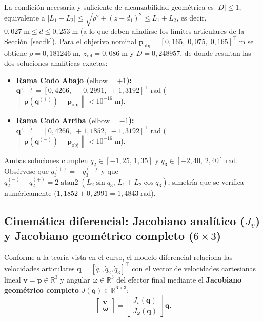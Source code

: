 \documentclass[11pt,a4paper]{article}
\newcommand{\Real}{\mathbb{R}}
\newcommand{\T}{^{\!\top}}
\newcommand{\norm}[1]{\left\lVert#1\right\rVert}
\newcommand{\abs}[1]{\left\lvert#1\right\rvert}
\newcommand{\qdot}{\dot{\bm{q}}}
\newcommand{\pdot}{\dot{\bm{p}}}
\begin{document}
La condición necesaria y suficiente de alcanzabilidad geométrica es $\abs{D}\le 1$, equivalente a $\abs{L_{1}-L_{2}}\le \sqrt{\rho^{2}+(z-d_{1})^{2}}\le L_{1}+L_{2}$, es decir, $0{,}027\;\text{m}\le d\le 0{,}253\;\text{m}$ (a lo que deben añadirse los límites articulares de la Sección~\ref{sec:fk}). Para el objetivo nominal $\bm{p}_{\text{obj}}=[0{,}165,\;0{,}075,\;0{,}165]\T\;\text{m}$ se obtiene $\rho=0{,}181246\;\text{m}$, $z_{\text{rel}}=0{,}086\;\text{m}$ y $D=0{,}248957$, de donde resultan las dos soluciones analíticas exactas:
\begin{itemize}[leftmargin=*, topsep=2pt, itemsep=1pt]
\item \textbf{Rama Codo Abajo ($\text{elbow}=+1$):} $\bm{q}^{(+)}=[0{,}4266,\;-0{,}2991,\;+1{,}3192]\T\;\text{rad}$ ($\norm{\bm{p}(\bm{q}^{(+)})-\bm{p}_{\text{obj}}}<10^{-16}\;\text{m}$).
\item \textbf{Rama Codo Arriba ($\text{elbow}=-1$):} $\bm{q}^{(-)}=[0{,}4266,\;+1{,}1852,\;-1{,}3192]\T\;\text{rad}$ ($\norm{\bm{p}(\bm{q}^{(-)})-\bm{p}_{\text{obj}}}<10^{-16}\;\text{m}$).
\end{itemize}
Ambas soluciones cumplen $q_{2}\in[-1{,}25,\,1{,}35]$ y $q_{3}\in[-2{,}40,\,2{,}40]\;\text{rad}$. Obsérvese que $q_{3}^{(+)}=-q_{3}^{(-)}$ y que $q_{2}^{(-)}-q_{2}^{(+)}=2\operatorname{atan2}(L_{2}\sin q_{3},\,L_{1}+L_{2}\cos q_{3})$, simetría que se verifica numéricamente ($1{,}1852+0{,}2991=1{,}4843\;\text{rad}$).

\subsection{Cinemática diferencial: Jacobiano analítico ($J_{v}$) y Jacobiano geométrico completo ($6\times 3$)}
\label{sec:diff_kin}

Conforme a la teoría vista en el curso, el modelo diferencial relaciona las velocidades articulares $\qdot=[\dot{q}_{1},\dot{q}_{2},\dot{q}_{3}]\T$ con el vector de velocidades cartesianas lineal $\bm{v}=\pdot\in\Real^{3}$ y angular $\bm{\omega}\in\Real^{3}$ del efector final mediante el \textbf{Jacobiano geométrico completo} $J(\bm{q})\in\Real^{6\times 3}$:
\begin{equation}\label{eq:jac_full}
\begin{bmatrix}
\bm{v}\\
\bm{\omega}
\end{bmatrix}
=
\begin{bmatrix}
J_{v}(\bm{q})\\[2pt]
J_{\omega}(\bm{q})
\end{bmatrix}
\qdot.
\end{equation}
\end{document}
